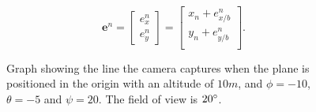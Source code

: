 \begin{equation}
	\bm{e}^n =
	\begin{bmatrix}
		e^n_{x} \\ e^n_{y}
	\end{bmatrix}
	=
	\begin{bmatrix}
		x_n + e^n_{x/b} \\
		y_n + e^n_{y/b} \\
	\end{bmatrix}.
\end{equation}

\begin{figure}[!ht]
    \centering
    \caption{Graph showing the line the camera captures when the plane is positioned in the origin with an altitude of $10m$, and $\phi=-10$, $\theta=-5$ and $\psi=20$. The field of view is $20\degree$.}
\end{figure}